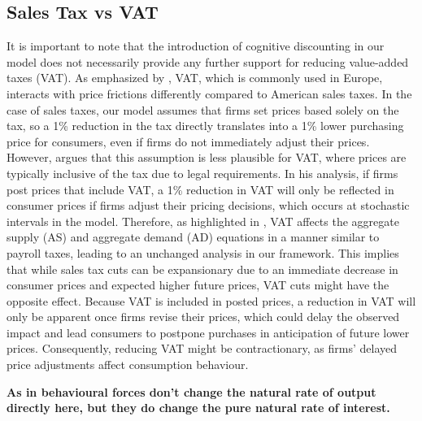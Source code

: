 \documentclass[11pt]{article}
\newcommand{\bb}{\bigbreak\noindent}
\begin{document}
\begin{spacing}{2}
\subsection{Sales Tax vs VAT}
It is important to note that the introduction of cognitive discounting in our model does not necessarily provide any further support for reducing value-added taxes (VAT). As emphasized by \cite{eggertsson2011fiscal}, VAT, which is commonly used in Europe, interacts with price frictions differently compared to American sales taxes. In the case of sales taxes, our model assumes that firms set prices based solely on the tax, so a 1\% reduction in the tax directly translates into a 1\% lower purchasing price for consumers, even if firms do not immediately adjust their prices.
\bb
However,\cite{eggertsson2011fiscal} argues that this assumption is less plausible for VAT, where prices are typically inclusive of the tax due to legal requirements. In his analysis, if firms post prices that include VAT, a 1\% reduction in VAT will only be reflected in consumer prices if firms adjust their pricing decisions, which occurs at stochastic intervals in the model. Therefore, as highlighted in \cite{eggertsson2004optimal} , VAT affects the aggregate supply (AS) and aggregate demand (AD) equations in a manner similar to payroll taxes, leading to an unchanged analysis in our framework.
\bb
This implies that while sales tax cuts can be expansionary due to an immediate decrease in consumer prices and expected higher future prices, VAT cuts might have the opposite effect. Because VAT is included in posted prices, a reduction in VAT will only be apparent once firms revise their prices, which could delay the observed impact and lead consumers to postpone purchases in anticipation of future lower prices. Consequently, reducing VAT might be contractionary, as firms' delayed price adjustments affect consumption behaviour.





\textbf{
As in behavioural forces don't change the natural rate of output directly here, but they do change the pure natural rate of interest.}







\end{spacing}
\end{document}

